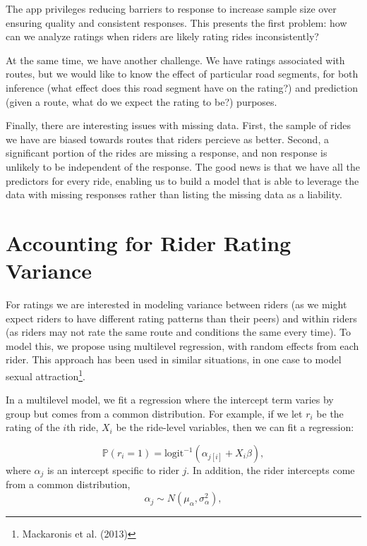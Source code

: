 \documentclass[12pt,twoside]{reedthesis}
\begin{document}
  The app privileges reducing barriers to response to increase sample size
  over ensuring quality and consistent responses. This presents the first
  problem: how can we analyze ratings when riders are likely rating rides
  inconsistently?
  
  At the same time, we have another challenge. We have ratings associated
  with routes, but we would like to know the effect of particular road
  segments, for both inference (what effect does this road segment have on
  the rating?) and prediction (given a route, what do we expect the rating
  to be?) purposes.
  
  Finally, there are interesting issues with missing data. First, the
  sample of rides we have are biased towards routes that riders percieve
  as better. Second, a significant portion of the rides are missing a
  response, and non response is unlikely to be independent of the
  response. The good news is that we have all the predictors for every
  ride, enabling us to build a model that is able to leverage the data
  with missing responses rather than listing the missing data as a
  liability.
  
  \section{Accounting for Rider Rating
  Variance}\label{accounting-for-rider-rating-variance}
  
  For ratings we are interested in modeling variance between riders (as we
  might expect riders to have different rating patterns than their peers)
  and within riders (as riders may not rate the same route and conditions
  the same every time). To model this, we propose using multilevel
  regression, with random effects from each rider. This approach has been
  used in similar situations, in one case to model sexual
  attraction\footnote{Mackaronis et al. (2013)}.
  
  In a multilevel model, we fit a regression where the intercept term
  varies by group but comes from a common distribution. For example, if we
  let \(r_i\) be the rating of the \(i\)th ride, \(X_i\) be the ride-level
  variables, then we can fit a regression:
  
  \[\mathbb{P}(r_i = 1) = \text{logit}^{-1}
  \left( \alpha_{j[i]} +  X_i \beta \right) ,\] where \(\alpha_j\) is an
  intercept specific to rider \(j\). In addition, the rider intercepts
  come from a common distribution,
  \[\alpha_j \sim N (\mu_\alpha, \sigma^2_\alpha),\]
  
\end{document}
